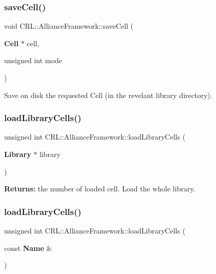 \subsubsection{\texorpdfstring{save\+Cell()}{saveCell()}}
{\footnotesize\ttfamily void C\+R\+L\+::\+Alliance\+Framework\+::save\+Cell (\begin{DoxyParamCaption}\item[{\textbf{ Cell} $\ast$}]{cell,  }\item[{unsigned int}]{mode }\end{DoxyParamCaption})}

Save on disk the requested Cell (in the revelant library directory). \mbox{\label{classCRL_1_1AllianceFramework_a2e43b1928a05eea4b2dc1fe0757e4865}} 
\subsubsection{\texorpdfstring{load\+Library\+Cells()}{loadLibraryCells()}\hspace{0.1cm}{\footnotesize\ttfamily [1/2]}}
{\footnotesize\ttfamily unsigned int C\+R\+L\+::\+Alliance\+Framework\+::load\+Library\+Cells (\begin{DoxyParamCaption}\item[{\textbf{ Library} $\ast$}]{library }\end{DoxyParamCaption})}

{\bfseries Returns\+:} the number of loaded cell. Load the whole library. \mbox{\label{classCRL_1_1AllianceFramework_adc8acedeb9daa37b4ab2dee0717835fa}} 
\subsubsection{\texorpdfstring{load\+Library\+Cells()}{loadLibraryCells()}\hspace{0.1cm}{\footnotesize\ttfamily [2/2]}}
{\footnotesize\ttfamily unsigned int C\+R\+L\+::\+Alliance\+Framework\+::load\+Library\+Cells (\begin{DoxyParamCaption}\item[{const \textbf{ Name} \&}]{ }\end{DoxyParamCaption})}

